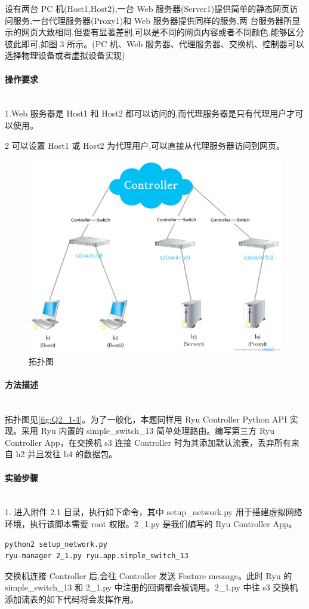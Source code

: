 \documentclass[format=draft,language=chinese,category=SDN]{hustreport}
\newcommand{\myparagraph}[1]{\paragraph{#1}\mbox{}\\}
\begin{document}
设有两台 PC 机(Host1,Host2),一台 Web 服务器(Server1)提供简单的静态网页访问服务,一台代理服务器(Proxy1)和 Web 服务器提供同样的服务,两
台服务器所显示的网页大致相同,但要有显著差别,可以是不同的网页内容或者不同颜色,能够区分彼此即可,如图 3 所示。(PC 机、Web 服务器、代理服务器、交换机、控制器可以选择物理设备或者虚拟设备实现)

\myparagraph{操作要求}

1.Web 服务器是 Host1 和 Host2 都可以访问的,而代理服务器是只有代理用户才可以使用。

2 可以设置 Host1 或 Host2 为代理用户,可以直接从代理服务器访问到网页。

\begin{figure}[!h]
\centering
\includegraphics[width=.618\textwidth]{fig/2_1-4.png}
\caption{拓扑图}\label{fig:Q2_1-4}
\end{figure}

\myparagraph{方法描述}

拓扑图见\autoref{fig:Q2_1-4}。为了一般化，本题同样用 Ryu Controller Python API 实现。采用 Ryu 内置的 simple\_switch\_13 简单处理路由。编写第三方 Ryu Controller App，在交换机 s3 连接 Controller 时为其添加默认流表，丢弃所有来自 h2 并且发往 h4 的数据包。

\myparagraph{实验步骤}

1. 进入附件 2.1 目录，执行如下命令，其中 setup\_network.py 用于搭建虚拟网络环境，执行该脚本需要 root 权限。2\_1.py 是我们编写的 Ryu Controller App。

\begin{lstlisting}
python2 setup_network.py
ryu-manager 2_1.py ryu.app.simple_switch_13
\end{lstlisting}

交换机连接 Controller 后,会往 Controller 发送 Feature message。此时 Ryu 的 simple\_switch\_13 和 2\_1.py 中注册的回调都会被调用。2\_1.py 中往 s3 交换机添加流表的如下代码将会发挥作用。
\end{document}
